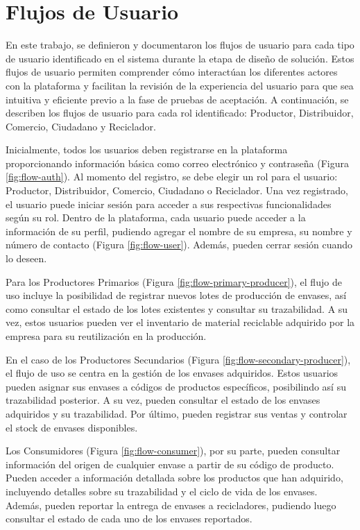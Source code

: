 \chapter{Flujos de Usuario}
\label{cp:user-flows}

\parindent0pt

En este trabajo, se definieron y documentaron los flujos de usuario para cada tipo de usuario identificado en el sistema durante la etapa de diseño de solución. Estos flujos de usuario permiten comprender cómo interactúan los diferentes actores con la plataforma y facilitan la revisión de la experiencia del usuario para que sea intuitiva y eficiente previo a la fase de pruebas de aceptación. A continuación, se describen los flujos de usuario para cada rol identificado: Productor, Distribuidor, Comercio, Ciudadano y Reciclador.

Inicialmente, todos los usuarios deben registrarse en la plataforma proporcionando información básica como correo electrónico y contraseña (Figura \ref{fig:flow-auth}). Al momento del registro, se debe elegir un rol para el usuario: Productor, Distribuidor, Comercio, Ciudadano o Reciclador. Una vez registrado, el usuario puede iniciar sesión para acceder a sus respectivas funcionalidades según su rol. Dentro de la plataforma, cada usuario puede acceder a la información de su perfil, pudiendo agregar el nombre de su empresa, su nombre y número de contacto (Figura \ref{fig:flow-user}). Además, pueden cerrar sesión cuando lo deseen.

Para los Productores Primarios (Figura \ref{fig:flow-primary-producer}), el flujo de uso incluye la posibilidad de registrar nuevos lotes de producción de envases, así como consultar el estado de los lotes existentes y consultar su trazabilidad. A su vez, estos usuarios pueden ver el inventario de material reciclable adquirido por la empresa para su reutilización en la producción.

En el caso de los Productores Secundarios (Figura \ref{fig:flow-secondary-producer}), el flujo de uso se centra en la gestión de los envases adquiridos. Estos usuarios pueden asignar sus envases a códigos de productos específicos, posibilindo así su trazabilidad posterior. A su vez, pueden consultar el estado de los envases adquiridos y su trazabilidad. Por último, pueden registrar sus ventas y controlar el stock de envases disponibles.

Los Consumidores (Figura \ref{fig:flow-consumer}), por su parte, pueden consultar información del origen de cualquier envase a partir de su código de producto. Pueden acceder a información detallada sobre los productos que han adquirido, incluyendo detalles sobre su trazabilidad y el ciclo de vida de los envases. Además, pueden reportar la entrega de envases a recicladores, pudiendo luego consultar el estado de cada uno de los envases reportados.


